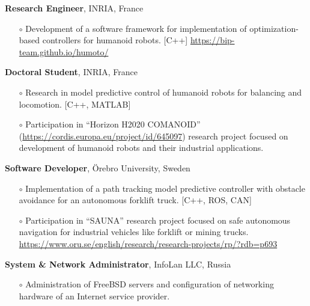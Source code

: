\documentclass[a4paper,10pt]{report}
\begin{document}
\begin{adjustwidth}{0.5cm}{0pt}
    \vspace{0.15cm}

    {\bf {} Research Engineer}, INRIA, France
    \begin{itemize}
        \item[$\circ$] Development of a software framework for implementation
            of optimization-based controllers for humanoid robots. [C++]
            \url{https://bip-team.github.io/humoto/}
    \end{itemize}

    \vspace{0.15cm}

    {\bf {} Doctoral Student}, INRIA, France
    \begin{itemize}
        \item[$\circ$] Research in model predictive control of humanoid robots
            for balancing and locomotion. [C++, MATLAB]

        \item[$\circ$] Participation in ``Horizon H2020 COMANOID''
            (\url{https://cordis.europa.eu/project/id/645097}) research project
            focused on development of humanoid robots and their industrial
            applications.
    \end{itemize}

    \vspace{0.15cm}

    {\bf {} Software Developer}, \"Orebro University, Sweden
    \begin{itemize}
        \item[$\circ$] Implementation of a path tracking model predictive
            controller with obstacle avoidance for an autonomous forklift
            truck. [C++, ROS, CAN]

        \item[$\circ$] Participation in ``SAUNA'' research project focused on
            safe autonomous navigation for industrial vehicles like forklift or
            mining trucks.
            \url{https://www.oru.se/english/research/research-projects/rp/?rdb=p693}
    \end{itemize}

    \vspace{0.15cm}

    {\bf {} System \& Network Administrator}, InfoLan LLC, Russia
    \begin{itemize}
        \item[$\circ$] Administration of FreeBSD servers and configuration of
            networking hardware of an Internet service provider.
    \end{itemize}
\end{adjustwidth}
\end{document}
